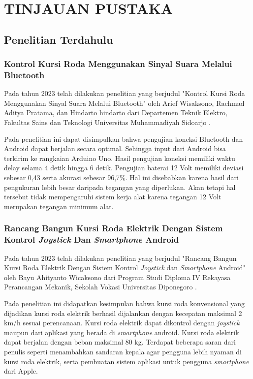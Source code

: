 \chapter{TINJAUAN PUSTAKA}
\label{chap:tinjauanpustaka}


\section{Penelitian Terdahulu}
\label{sec:penelitianterdahulu}

\subsection{Kontrol Kursi Roda Menggunakan Sinyal Suara Melalui Bluetooth}

Pada tahun 2023 telah dilakukan penelitian yang berjudul "Kontrol Kursi Roda Menggunakan Sinyal Suara Melalui Bluetooth" oleh Arief Wisaksono, Rachmad Aditya Pratama, dan Hindarto hindarto dari Departemen Teknik Elektro, Fakultas Sains dan Teknologi Universitas Muhammadiyah Sidoarjo \parencite{wisaksono2023kontrol}.

Pada penelitian ini dapat disimpulkan bahwa pengujian koneksi Bluetooth dan Android dapat berjalan secara optimal. Sehingga input dari Android bisa terkirim ke rangkaian Arduino Uno. Hasil pengujian koneksi memiliki waktu delay selama 4 detik hingga 6 detik. Pengujian baterai 12 Volt memiliki deviasi sebesar 0,43 serta akurasi sebesar 96,7\%. Hal ini disebabkan karena hasil dari pengukuran lebih besar daripada tegangan yang diperlukan. Akan tetapi hal tersebut tidak mempengaruhi sistem kerja alat karena tegangan 12 Volt merupakan tegangan minimum alat.

\subsection{Rancang Bangun Kursi Roda Elektrik Dengan Sistem Kontrol \emph{Joystick} Dan \emph{Smartphone} Android}

Pada tahun 2023 telah dilakukan penelitian yang berjudul "Rancang Bangun Kursi Roda Elektrik Dengan Sistem Kontrol \emph{Joystick} dan \emph{Smartphone} Android" oleh Bayu Ahityanto Wicaksono dari Program Studi Diploma IV Rekayasa Perancangan Mekanik, Sekolah Vokasi Universitas Diponegoro \parencite{wicaksono2023rancang}.

Pada penelitian ini didapatkan kesimpulan bahwa kursi roda konvensional yang dijadikan kursi roda elektrik berhasil dijalankan dengan kecepatan maksimal 2 km/h sesuai perencanaan. Kursi roda elektrik dapat dikontrol dengan \emph{joystick} maupun dari aplikasi yang berada di \emph{smartphone} android. Kursi roda elektrik dapat berjalan dengan beban maksimal 80 kg. Terdapat beberapa saran dari penulis seperti menambahkan sandaran kepala agar pengguna lebih nyaman di kursi roda elektrik, serta pembuatan sistem aplikasi untuk pengguna \emph{smartphone} dari Apple.

